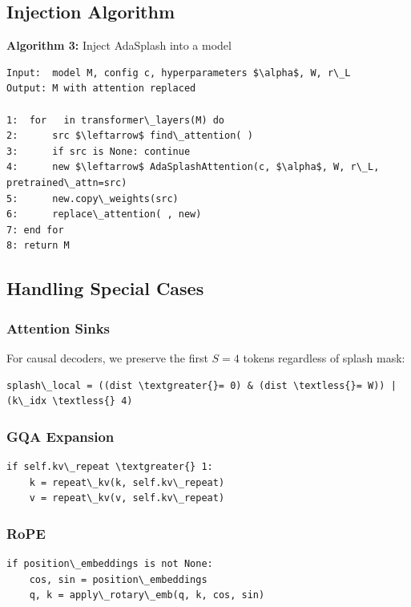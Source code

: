 \subsection{Injection Algorithm}

\textbf{Algorithm 3:} Inject AdaSplash into a model
\begin{lstlisting}
Input:  model M, config c, hyperparameters $\alpha$, W, r\_L
Output: M with attention replaced

1:  for   in transformer\_layers(M) do
2:      src $\leftarrow$ find\_attention( )
3:      if src is None: continue
4:      new $\leftarrow$ AdaSplashAttention(c, $\alpha$, W, r\_L, pretrained\_attn=src)
5:      new.copy\_weights(src)
6:      replace\_attention( , new)
7: end for
8: return M
\end{lstlisting}

\subsection{Handling Special Cases}

\subsubsection{Attention Sinks}

For causal decoders, we preserve the first $S = 4$ tokens regardless of 
splash mask:

\begin{lstlisting}
splash\_local = ((dist \textgreater{}= 0) & (dist \textless{}= W)) | (k\_idx \textless{} 4)
\end{lstlisting}

\subsubsection{GQA Expansion}

\begin{lstlisting}
if self.kv\_repeat \textgreater{} 1:
    k = repeat\_kv(k, self.kv\_repeat)
    v = repeat\_kv(v, self.kv\_repeat)
\end{lstlisting}

\subsubsection{RoPE}

\begin{lstlisting}
if position\_embeddings is not None:
    cos, sin = position\_embeddings
    q, k = apply\_rotary\_emb(q, k, cos, sin)
\end{lstlisting}

